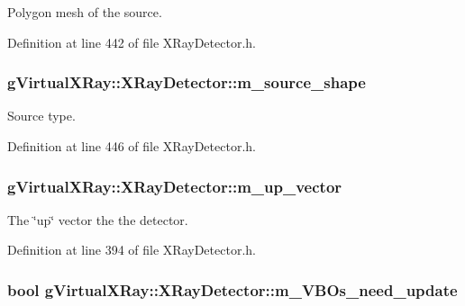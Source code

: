 Polygon mesh of the source. 



Definition at line 442 of file XRayDetector.h.

\hypertarget{classg_virtual_x_ray_1_1_x_ray_detector_a58ee142a64962d69bb203fcae40a8c6f}{
\subsubsection[{m\_\-source\_\-shape}]{ {\bf gVirtualXRay::XRayDetector::m\_\-source\_\-shape}}}
\label{classg_virtual_x_ray_1_1_x_ray_detector_a58ee142a64962d69bb203fcae40a8c6f}


Source type. 



Definition at line 446 of file XRayDetector.h.

\hypertarget{classg_virtual_x_ray_1_1_x_ray_detector_ac03caffd75f0386f2dda388c2c38b782}{
\subsubsection[{m\_\-up\_\-vector}]{ {\bf gVirtualXRay::XRayDetector::m\_\-up\_\-vector}}}
\label{classg_virtual_x_ray_1_1_x_ray_detector_ac03caffd75f0386f2dda388c2c38b782}


The \char`\"{}up\char`\"{} vector the the detector. 



Definition at line 394 of file XRayDetector.h.

\hypertarget{classg_virtual_x_ray_1_1_x_ray_detector_a69d92de8630dfb70270b914a4b3459a9}{
\subsubsection[{m\_\-VBOs\_\-need\_\-update}]{\setlength{\rightskip}{0pt plus 5cm}bool {\bf gVirtualXRay::XRayDetector::m\_\-VBOs\_\-need\_\-update}}}
\label{classg_virtual_x_ray_1_1_x_ray_detector_a69d92de8630dfb70270b914a4b3459a9}


